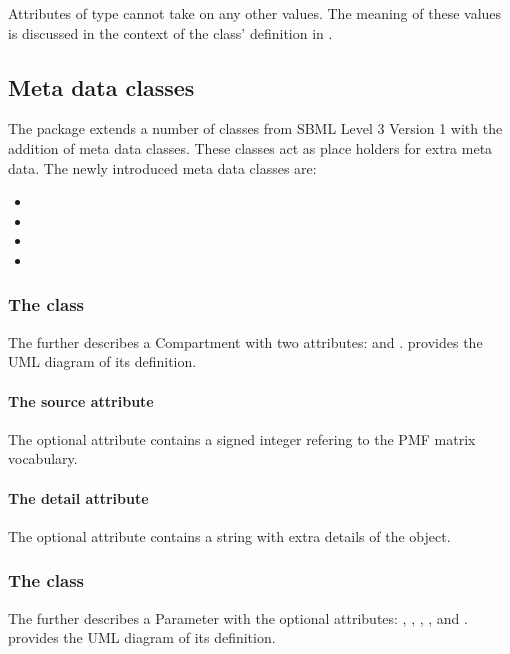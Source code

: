 Attributes of type  cannot take on any other values. The
meaning of these values is discussed in the context of the \RuleMetaData class'
definition in .

\subsection{Meta data classes}
The \Pmf package extends a number of classes from SBML Level 3 Version 1 with
the addition of meta data classes. These classes act as place holders for extra
meta data. The newly introduced meta data classes are:
\begin{itemize}
	\item \CompartmentMetaData
	\item \ParameterMetaData
	\item \RuleMetaData
	\item \SpeciesMetaData
\end{itemize}


\subsubsection{The  class}
\label{compartmentmetadata-class}
The \CompartmentMetaData further describes a Compartment with two attributes:
 and .  provides the UML
diagram of its definition.

\paragraph{The source attribute}
The optional attribute  contains a signed integer refering to the
PMF matrix vocabulary.

\paragraph{The detail attribute}
The optional attribute  contains a string with extra details of
the \Compartment object.


\subsubsection{The  class}
\label{parametermetadata-class}
The \ParameterMetaData further describes a Parameter with the optional
attributes: , , , ,
 and .  provides the UML diagram of its
definition.

